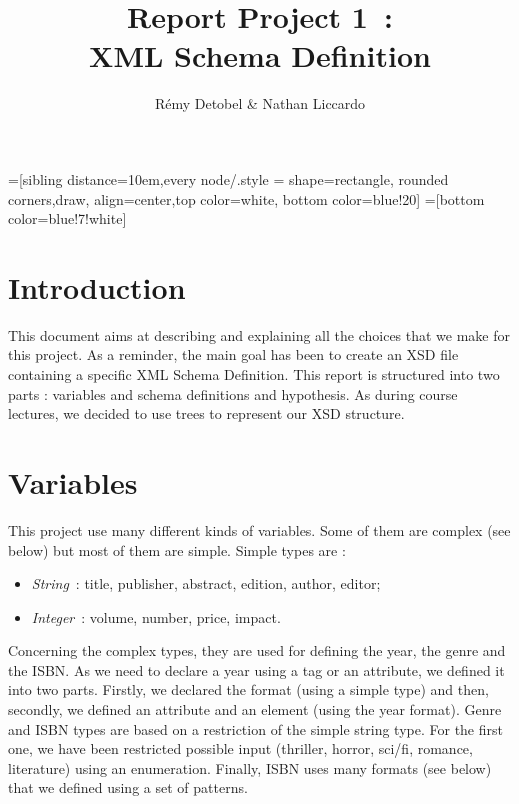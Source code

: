 \documentclass{article}
\author{R\'emy Detobel \& Nathan Liccardo}
\title{Report Project 1~:\\XML Schema Definition}
\begin{document}
=[sibling distance=10em,every node/.style = {shape=rectangle, rounded corners,draw, align=center,top color=white, bottom color=blue!20}]
=[bottom color=blue!7!white]

\maketitle

\section{Introduction}
This document aims at describing and explaining all the choices that we make for this project. As a reminder, the main goal has been to create an XSD file containing a specific XML Schema Definition. This report is structured into two parts : variables and schema definitions and hypothesis. As during course lectures, we decided to use trees to represent our XSD structure.
 
\section{Variables}
  \label{sec:variables}
This project use many different kinds of variables. Some of them are complex (see below) but most of them are simple. Simple types are : 
  \begin{itemize}
    \item \textit{String}~: title, publisher, abstract, edition, author, editor;
    \item \textit{Integer}~: volume, number, price, impact.
  \end{itemize}
Concerning the complex types, they are used for defining the year, the genre and the ISBN. As we need to declare a year using a tag or an attribute, we defined it into two parts. Firstly, we declared the format (using a simple type) and then, secondly, we defined an attribute and an element (using the year format). Genre and ISBN types are based on a restriction of the simple string type. For the first one, we have been restricted possible input (thriller, horror, sci/fi, romance, literature) using an enumeration. Finally, ISBN uses many formats (see below) that we defined using a set of patterns.
  
\end{document}
